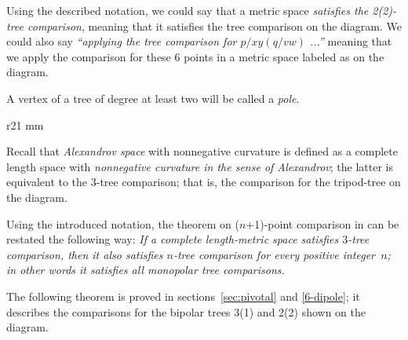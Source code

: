 Using the described notation, we could say that a metric space \emph{satisfies the 2(2)-tree comparison},  meaning that it satisfies the tree comparison on the diagram.
We could also say \emph{``applying the tree comparison for $p/xy(q/vw)$ ...''} meaning that we apply the comparison for these 6 points in a metric space labeled as on the diagram.

A vertex of a tree of degree at least two will be called a \emph{pole}.

\begin{wrapfigure}{r}{21 mm}
\end{wrapfigure}

Recall that \emph{Alexandrov space} with nonnegative curvature is defined as a complete length space with \emph{nonnegative curvature in the sense of Alexandrov};
the latter is equivalent to the 3-tree comparison; that is, the comparison for the tripod-tree on the diagram. 

Using the introduced notation, the theorem on ($n$+1)-point comparison in \cite{AKP} can be restated the following way: \emph{If a complete length-metric space satisfies $3$-tree comparison, then it also satisfies $n$-tree comparison for every positive integer~$n$; in other words it satisfies all monopolar tree comparisons.}

The following theorem is proved in sections~\ref{sec:pivotal} and \ref{6-dipole};
it describes the comparisons for the bipolar trees 3(1) and 2(2) shown on the diagram.

